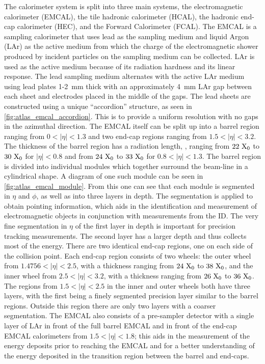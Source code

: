 The calorimeter system is split into three main systems, 
the electromagnetic calorimeter (EMCAL), the 
tile hadronic calorimeter (HCAL), the hadronic 
end-cap calorimeter (HEC), 
and the Forward Calorimeter (FCAL).
The EMCAL is a sampling calorimeter that uses lead as the sampling
medium and liquid Argon (LAr) as
the active medium from which the charge of the electromagnetic
shower produced by incident particles on the sampling medium
can be collected.  LAr is used as the active medium 
because of its radiation hardness and its linear response.
The lead sampling medium alternates with the active LAr medium
using lead plates 1-2~mm thick with an approximately 4~mm 
LAr gap between each sheet and electrodes placed in the middle of
the gaps.
The lead sheets are constructed using a unique ``accordion'' structure,
as seen in \fig\ref{fig:atlas_emcal_accordion}. 
This is to provide a uniform resolution with no gaps
in the azimuthal direction.
The EMCAL itself can be split up into a barrel region ranging
from $0<|\eta|<1.3$ and two end-cap regions ranging from 
$1.5 < |\eta| < 3.2$.
The thickness of the barrel region has a radiation length, \xzero,
ranging from $22~\textrm{X}_0$ to $30~\textrm{X}_0$
for $|\eta|<0.8$ and from $24~\textrm{X}_0$ to $33~\textrm{X}_0$ for
$0.8 < |\eta| < 1.3$.
The barrel region is divided into individual modules
which together surround the beam-line
in a cylindrical shape.  A diagram of one such module
can be seen in \fig\ref{fig:atlas_emcal_module}.
From this one can see that each module is segmented in $\eta$
and $\phi$, as well as into three layers in depth.
The segmentation is applied to obtain pointing information, 
which aids in the identification and measurement of electromagnetic
objects in conjunction with measurements from the ID.
The very fine segmentation in $\eta$ of the first layer
in depth is important for precision tracking measurements.
The second layer has a larger depth and thus collects most of the energy.
There are two identical end-cap regions, one on each side of the 
collision point. Each end-cap region consists of two wheels: the 
outer wheel from $1.4756 < |\eta| < 2.5$, with a thickness ranging from
$24~\textrm{X}_0$ to $38~\textrm{X}_0$, and 
the inner wheel from $2.5 < |\eta| < 3.2$, with a thickness ranging from
$26~\textrm{X}_0$ to $36~\textrm{X}_0$.
The regions from $1.5 < |\eta|<2.5$ in the inner and outer wheels both
have three layers, with the first being a finely segmented precision
layer similar to the barrel regions. Outside this region there 
are only two layers with a coarser segmentation.
The EMCAL also consists of a pre-sampler detector with a single layer of LAr in 
front of the full barrel EMCAL and in front of the end-cap EMCAL calorimeters
from $1.5 < |\eta| < 1.8$; this aids in the measurement of the energy deposits
prior to reaching the EMCAL and for a better understanding of the energy deposited
in the transition region between the barrel and end-caps.


